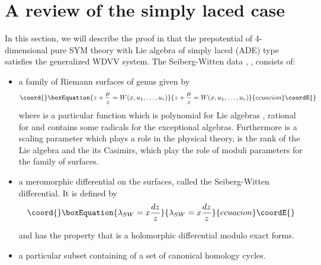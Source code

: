 \documentclass[a4paper,11pt]{article}
\numberwithin{equation}{section}
\begin{document}
\section{A review of the simply laced case}

In this section, we will describe the proof in \cite{ITO-YANG:1998} 
that the prepotential of 4-dimensional pure \coordHE{} SYM theory
with Lie algebra of simply laced (ADE) type satisfies the generalized WDVV
system. The Seiberg-Witten data \cite{SEIB-WITT1:1994}, \cite
{GORS-KRIC-MARS-MIRO-MORO:1995}, \cite{MART-WARN:1996} consists of:

\bigskip

\begin{itemize}
\item  a family of Riemann surfaces \myHighlight{$\Sigma$}\coordHE{} of genus \coordHE{} given by 
\begin{equation}\coord{}\boxEquation{
z+\dfrac{\mu }{z}=W(x,u_{1},\ldots ,u_{r})  \label{surface_ADE}
}{
z+\dfrac{\mu }{z}=W(x,u_{1},\ldots ,u_{r})  }{ecuacion}\coordE{}\end{equation}
where \coordHE{} is a particular function which is polynomial for Lie algebras \coordHE{}, rational for \coordHE{} and contains some radicals for the exceptional
algebras. Furthermore \myHighlight{$\mu $}\coordHE{} is a scaling parameter which plays a role in
the physical theory, \coordHE{} is the rank of the Lie algebra and the \coordHE{} its
Casimirs, which play the role of moduli parameters for the family of
surfaces.

\item  a meromorphic differential \coordHE{} on the surfaces,
called the Seiberg-Witten differential. It is defined by 
\begin{equation}\coord{}\boxEquation{
\lambda _{SW}=x\dfrac{dz}{z}
}{
\lambda _{SW}=x\dfrac{dz}{z}
}{ecuacion}\coordE{}\end{equation}

and has the property that \coordHE{}
is a holomorphic differential modulo exact forms.

\item  a particular subset \coordHE{} containing \coordHE{} of a set of \coordHE{}
canonical homology cycles.
\end{itemize}
\end{document}
